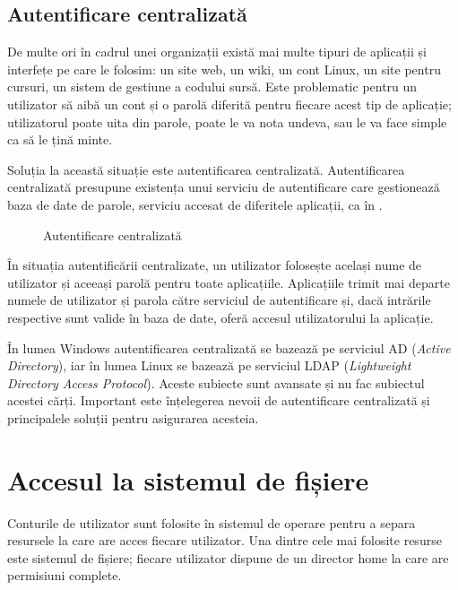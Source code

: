 \subsection{Autentificare centralizată}
\label{sec:user:centralized-auth}

De multe ori în cadrul unei organizații există mai multe tipuri de aplicații și interfețe pe care le folosim: un site web, un wiki, un cont Linux, un site pentru cursuri, un sistem de gestiune a codului sursă.
Este problematic pentru un utilizator să aibă un cont și o parolă diferită pentru fiecare acest tip de aplicație;
utilizatorul poate uita din parole, poate le va nota undeva, sau le va face simple ca să le țină minte.

Soluția la această situație este autentificarea centralizată.
Autentificarea centralizată presupune existența unui serviciu de autentificare care gestionează baza de date de parole, serviciu accesat de diferitele aplicații, ca în .

\begin{figure}[htbp]
  \centering
  \def\svgwidth{0.7\columnwidth}
  
  \caption{Autentificare centralizată}
  \label{fig:user:centralized-auth}
\end{figure}

În situația autentificării centralizate, un utilizator folosește același nume de utilizator și aceeași parolă pentru toate aplicațiile.
Aplicațiile trimit mai departe numele de utilizator și parola către serviciul de autentificare și, dacă intrările respective sunt valide în baza de date, oferă accesul utilizatorului la aplicație.

În lumea Windows autentificarea centralizată se bazează pe serviciul AD  (\textit{Active Directory}), iar în lumea Linux se bazează pe serviciul LDAP  (\textit{Lightweight Directory Access Protocol}).
Aceste subiecte sunt avansate și nu fac subiectul acestei cărți.
Important este înțelegerea nevoii de autentificare centralizată și principalele soluții pentru asigurarea acesteia.

\section{Accesul la sistemul de fișiere}
\label{sec:user:fs-access}

Conturile de utilizator sunt folosite în sistemul de operare pentru a separa resursele la care are acces fiecare utilizator.
Una dintre cele mai folosite resurse este sistemul de fișiere;
fiecare utilizator dispune de un director home la care are permisiuni complete.

